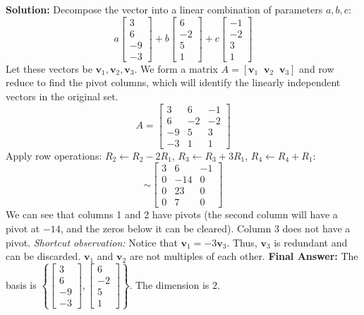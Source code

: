 \documentclass[12pt]{article}
\begin{document}
\textbf{Solution:}
Decompose the vector into a linear combination of parameters $a, b, c$:
\[ a \begin{bmatrix} 3 \\ 6 \\ -9 \\ -3 \end{bmatrix} + b \begin{bmatrix} 6 \\ -2 \\ 5 \\ 1 \end{bmatrix} + c \begin{bmatrix} -1 \\ -2 \\ 3 \\ 1 \end{bmatrix} \]
Let these vectors be $\mathbf{v}_1, \mathbf{v}_2, \mathbf{v}_3$. We form a matrix $A = [\mathbf{v}_1 \;\; \mathbf{v}_2 \;\; \mathbf{v}_3]$ and row reduce to find the pivot columns, which will identify the linearly independent vectors in the original set.
\[ A = \begin{bmatrix} 3 & 6 & -1 \\ 6 & -2 & -2 \\ -9 & 5 & 3 \\ -3 & 1 & 1 \end{bmatrix} \]
Apply row operations: $R_2 \leftarrow R_2 - 2R_1$, $R_3 \leftarrow R_3 + 3R_1$, $R_4 \leftarrow R_4 + R_1$:
\[ \sim \begin{bmatrix} 3 & 6 & -1 \\ 0 & -14 & 0 \\ 0 & 23 & 0 \\ 0 & 7 & 0 \end{bmatrix} \]
We can see that columns 1 and 2 have pivots (the second column will have a pivot at $-14$, and the zeros below it can be cleared). Column 3 does not have a pivot. 
\textit{Shortcut observation:} Notice that $\mathbf{v}_1 = -3\mathbf{v}_3$. Thus, $\mathbf{v}_3$ is redundant and can be discarded. $\mathbf{v}_1$ and $\mathbf{v}_2$ are not multiples of each other.
\textbf{Final Answer:} 
The basis is $\left\{ \begin{bmatrix} 3 \\ 6 \\ -9 \\ -3 \end{bmatrix}, \begin{bmatrix} 6 \\ -2 \\ 5 \\ 1 \end{bmatrix} \right\}$. The dimension is $2$.
\end{document}
